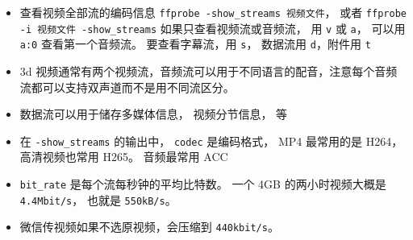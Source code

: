 
\begin{issues}
\issueDraft
\end{issues}

\begin{itemize}
\item 查看视频全部流的编码信息 \verb|ffprobe -show_streams 视频文件|， 或者 \verb|ffprobe -i 视频文件 -show_streams| 如果只查看视频流或音频流， 用 \verb|v| 或 \verb|a|， 可以用 \verb|a:0| 查看第一个音频流。 要查看字幕流，用 \verb|s|， 数据流用 \verb|d|，附件用 \verb|t|
\item 3d 视频通常有两个视频流，音频流可以用于不同语言的配音，注意每个音频流都可以支持双声道而不是用不同流区分。
\item 数据流可以用于储存多媒体信息， 视频分节信息， 等
\item 在 \verb|-show_streams| 的输出中， \verb|codec| 是编码格式， MP4 最常用的是 H264， 高清视频也常用 H265。 音频最常用 ACC
\item \verb|bit_rate| 是每个流每秒钟的平均比特数。 一个 4GB 的两小时视频大概是 \verb|4.4Mbit/s|， 也就是 \verb|550kB/s|。
\item 微信传视频如果不选原视频，会压缩到 \verb|440kbit/s|。
\end{itemize}
